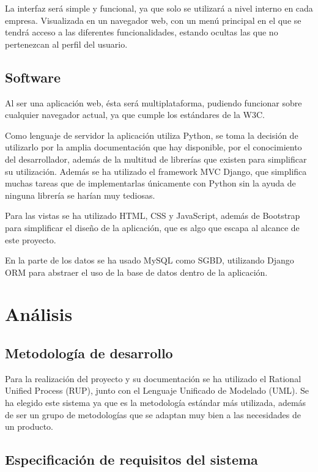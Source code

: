 \documentclass[12pt,a4paperpaper,]{report}
\begin{document}
La interfaz será simple y funcional, ya que solo se utilizará a nivel
interno en cada empresa. Visualizada en un navegador web, con un menú
principal en el que se tendrá acceso a las diferentes funcionalidades,
estando ocultas las que no pertenezcan al perfil del usuario.

\section{Software}\label{software}

Al ser una aplicación web, ésta será multiplataforma, pudiendo funcionar
sobre cualquier navegador actual, ya que cumple los estándares de la
W3C.

Como lenguaje de servidor la aplicación utiliza Python, se toma la
decisión de utilizarlo por la amplia documentación que hay disponible,
por el conocimiento del desarrollador, además de la multitud de
librerías que existen para simplificar su utilización. Además se ha
utilizado el framework MVC Django, que simplifica muchas tareas que de
implementarlas únicamente con Python sin la ayuda de ninguna librería se
harían muy tediosas.

Para las vistas se ha utilizado HTML, CSS y JavaScript, además de
Bootstrap para simplificar el diseño de la aplicación, que es algo que
escapa al alcance de este proyecto.

En la parte de los datos se ha usado MySQL como SGBD, utilizando Django
ORM para abstraer el uso de la base de datos dentro de la aplicación.

\chapter{Análisis}\label{anuxe1lisis}

\section{Metodología de desarrollo}\label{metodologuxeda-de-desarrollo}

Para la realización del proyecto y su documentación se ha utilizado el
Rational Unified Process (RUP), junto con el Lenguaje Unificado de
Modelado (UML). Se ha elegido este sistema ya que es la metodología
estándar más utilizada, además de ser un grupo de metodologías que se
adaptan muy bien a las necesidades de un producto.

\section{Especificación de requisitos del
sistema}\label{especificaciuxf3n-de-requisitos-del-sistema}
\end{document}
